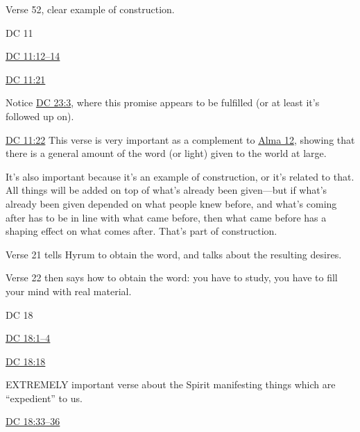 \begin{compactdesc}
\begin{compactitem}
\begin{compactitem}
						\end{compactitem}
					\item Verse 52, clear example of construction.
				\end{compactitem}
			\item DC 11
				\begin{compactitem}
					\item \hyperref[DC11-12]{DC 11:12--14}
					\item \hyperref[DC11-21]{DC 11:21}
						\begin{compactitem}
							\item Notice \hyperref[DC23-3]{DC 23:3}, where this promise appears to be fulfilled (or at least it's followed up on).
						\end{compactitem}
					\item \hyperref[DC11-22]{DC 11:22} This verse is very important as a complement to \hyperref[ALMA-12]{Alma 12}, showing that there is a general amount of the word (or light) given to the world at large. 
						\begin{compactitem}
							\item It's also important because it's an example of construction, or it's related to that. All things will be added on top of what's already been given---but if what's already been given depended on what people knew before, and what's coming after has to be in line with what came before, then what came before has a shaping effect on what comes after. That's part of construction.
							\item Verse 21 tells Hyrum to obtain the word, and talks about the resulting desires.
							\item Verse 22 then says how to obtain the word: you have to study, you have to fill your mind with real material.
						\end{compactitem}
				\end{compactitem}
			\item DC 18
				\begin{compactitem}
					\item \hyperref[DC18-1]{DC 18:1--4}
					\item \hyperref[DC18-18]{DC 18:18}
						\begin{compactitem}
							\item EXTREMELY important verse about the Spirit manifesting things which are ``expedient'' to us.
						\end{compactitem}
					\item \hyperref[DC18-33]{DC 18:33--36}

\end{compactitem}
\end{compactdesc}
